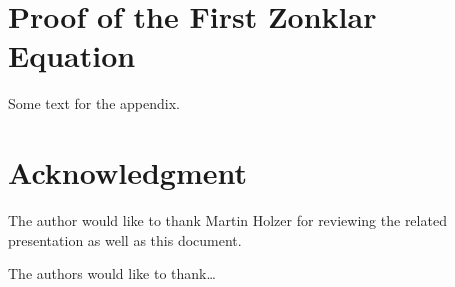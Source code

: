 \documentclass[journal]{IEEEtran}
\begin{document}
%


\appendices{}
\section{Proof of the First Zonklar Equation}
Some text for the appendix.

\section*{Acknowledgment}

The author would like to thank Martin Holzer for reviewing the related presentation as well as this document.


The authors would like to thank\ldots


\ifCLASSOPTIONcaptionsoff{}
  \newpage
\fi





% 
%







\end{document}
